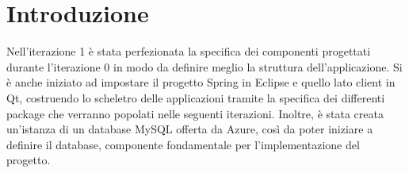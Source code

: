 \section{Introduzione}
Nell'iterazione 1 è stata perfezionata la specifica dei componenti progettati durante l'iterazione 0 in modo da definire meglio la struttura dell'applicazione. Si è anche iniziato ad impostare il progetto Spring in Eclipse e quello lato client in Qt, costruendo lo scheletro delle applicazioni tramite la specifica dei differenti package che verranno popolati nelle seguenti iterazioni. Inoltre, è stata creata un'istanza di un database MySQL offerta da Azure, così da poter iniziare a definire il database, componente fondamentale per l'implementazione del progetto.